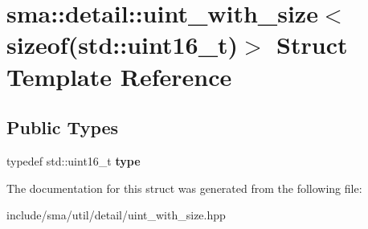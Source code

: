\hypertarget{structsma_1_1detail_1_1uint__with__size_3_01sizeof_07std_1_1uint16__t_08_4}{\section{sma\-:\-:detail\-:\-:uint\-\_\-with\-\_\-size$<$ sizeof(std\-:\-:uint16\-\_\-t)$>$ Struct Template Reference}
\label{structsma_1_1detail_1_1uint__with__size_3_01sizeof_07std_1_1uint16__t_08_4}
}
\subsection*{Public Types}
\begin{DoxyCompactItemize}
\item 
\hypertarget{structsma_1_1detail_1_1uint__with__size_3_01sizeof_07std_1_1uint16__t_08_4_a8ef74e2b636f7ec3e30ae8102485d787}{typedef std\-::uint16\-\_\-t {\bfseries type}}\label{structsma_1_1detail_1_1uint__with__size_3_01sizeof_07std_1_1uint16__t_08_4_a8ef74e2b636f7ec3e30ae8102485d787}

\end{DoxyCompactItemize}


The documentation for this struct was generated from the following file\-:\begin{DoxyCompactItemize}
\item 
include/sma/util/detail/uint\-\_\-with\-\_\-size.\-hpp\end{DoxyCompactItemize}
